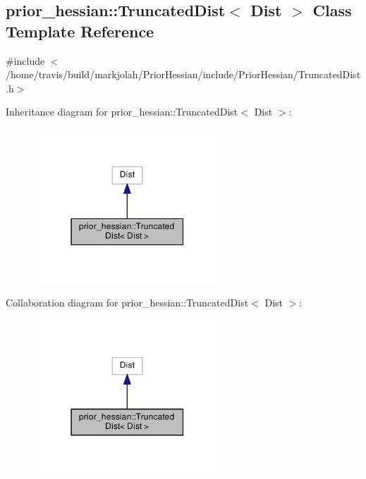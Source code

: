 \hypertarget{classprior__hessian_1_1TruncatedDist}{}\subsection{prior\+\_\+hessian\+:\+:Truncated\+Dist$<$ Dist $>$ Class Template Reference}
\label{classprior__hessian_1_1TruncatedDist}


{\ttfamily \#include $<$/home/travis/build/markjolah/\+Prior\+Hessian/include/\+Prior\+Hessian/\+Truncated\+Dist.\+h$>$}



Inheritance diagram for prior\+\_\+hessian\+:\+:Truncated\+Dist$<$ Dist $>$\+:\nopagebreak
\begin{figure}[H]
\begin{center}
\leavevmode
\includegraphics[width=199pt]{classprior__hessian_1_1TruncatedDist__inherit__graph}
\end{center}
\end{figure}


Collaboration diagram for prior\+\_\+hessian\+:\+:Truncated\+Dist$<$ Dist $>$\+:\nopagebreak
\begin{figure}[H]
\begin{center}
\leavevmode
\includegraphics[width=199pt]{classprior__hessian_1_1TruncatedDist__coll__graph}
\end{center}
\end{figure}
